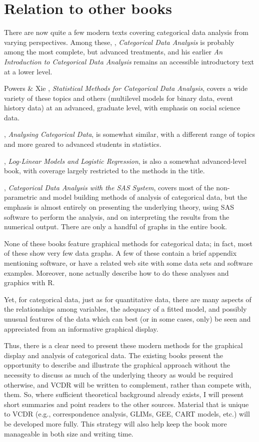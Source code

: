 \documentclass{article}
\newcommand{\VCDR}{\textsf{VCDR}\xspace}
\newcommand{\R}{\textsf{R}\xspace}
\begin{document}
\section*{Relation to other books}
There are now quite a few modern texts covering categorical data analysis from varying perspectives.
Among these, \citet{Agresti:2013}, \emph{Categorical Data Analysis} is probably among the most
complete, but advanced treatments, and his earlier \emph{An Introduction to Categorical Data Analysis}
\citep{Agresti:2007:ICDA} remains an accessible introductory text at a lower level.

Powers \& Xie \citeyear{PowersXie:2008}, \emph{Statistical Methods for Categorical Data Analysis},
covers a wide variety of these topics and others (multilevel models for binary data, event history data)
at an advanced, graduate level, with emphasis on social science data.

\citet{Simonoff:2003}, \emph{Analysing Categorical Data}, is somewhat similar, with a different
range of topics and more geared to advanced students in statistics.

\citet{Christensen:97}, \emph{Log-Linear Models and Logistic Regression}, is also a somewhat
advanced-level book, with coverage largely restricted to the methods in the title.

\citet{Stokes-etal:00}, \emph{Categorical Data Analysis with the SAS System},
covers most of the non-parametric and
model building methods of analysis
of categorical data, but the emphasis is almost entirely on
presenting the underlying theory,
using SAS software to perform the analysis, and on interpreting the results from the numerical output.
There are only a handful of graphs in the entire book.


None of these books feature graphical methods for categorical data;
in fact, most of these show very few data graphs.
A few of these contain a brief appendix mentioning software, or have
a related web site with some data sets and software examples.
Moreover, none actually describe how to do these analyses and graphics with \R.


Yet, for categorical data, just as for quantitative data,
there are many aspects of the relationships among variables,
the adequacy of a fitted model, and possibly unusual
features of the data which can best
(or in some cases, only) be seen and appreciated from an
informative graphical display.

Thus, there is a clear need to present these modern methods
for the graphical display and analysis of categorical data.
The existing books present the opportunity to describe
and illustrate the graphical approach without the necessity
to discuss as much of the underlying theory as would be
required otherwise, and \VCDR will be written to complement, rather than compete with,
them.  So, where sufficient theoretical background already
exists, I will present short summaries and point readers to
the other sources.  Material that is unique to \VCDR
(e.g.,  correspondence analysis, GLIMs, GEE, CART models, etc.)
will be developed more fully.
This strategy will also help keep the book more manageable
in both size and writing time.
\end{document}
